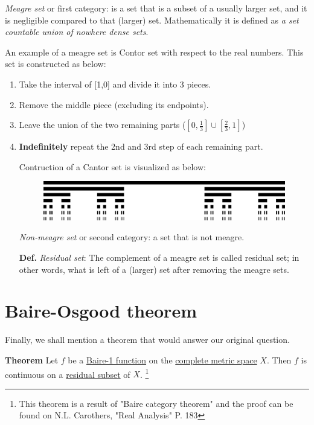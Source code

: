 \documentclass[11pt]{article}
\begin{document}
\emph{Meagre set} or first category: is a set that is a subset of a usually larger set, and it is negligible compared to that (larger) set.
Mathematically it is defined as \emph{a set countable union of nowhere dense sets}.

An example of a meagre set is Contor set with respect to the real numbers.
This set is constructed as below:

\begin{enumerate}
\item Take the interval of [1,0] and divide it into 3 pieces.
\item Remove the middle piece (excluding its endpoints).
\item Leave the union of the two remaining parts (\([0,\frac{1}{3}] \cup [\frac{2}{3},1]\))
\item \textbf{Indefinitely} repeat the 2nd and 3rd step of each remaining part.

Contruction of a Cantor set is visualized as below:

\begin{figure}[htbp]
\centering
\includegraphics[width=.9\linewidth]{./img/figure3.png}
\caption{\label{fig:org10ba7a6}}
\end{figure}

\emph{Non-meagre set} or second category: a set that is not meagre.

\textbf{Def.} \emph{Residual set}: The complement of a meagre set is called residual set; in other words, what is left of a (larger) set after removing the meagre sets.
\end{enumerate}

\section{Baire-Osgood theorem}
\label{sec:org77ec466}

Finally, we shall mention a theorem that would answer our original question.

\textbf{Theorem} Let \(f\) be a \uline{Baire-1 function} on the \uline{complete metric space} \(X\). Then \(f\) is continuous on a \uline{residual subset} of \(X\).
\footnote{This theorem is a result of "Baire category theorem" and the proof can be found on N.L. Carothers, "Real Analysis" P. 183}
\end{document}
